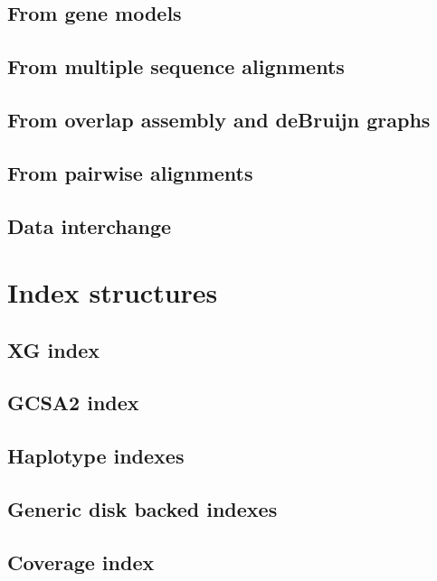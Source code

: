 \subsection{From gene models} %

\subsection{From multiple sequence alignments}

\subsection{From overlap assembly and deBruijn graphs}

\subsection{From pairwise alignments}

\subsection{Data interchange}


\section{Index structures}

\subsection{XG index}

\subsection{GCSA2 index}

\subsection{Haplotype indexes}

\subsection{Generic disk backed indexes}

\subsection{Coverage index}


